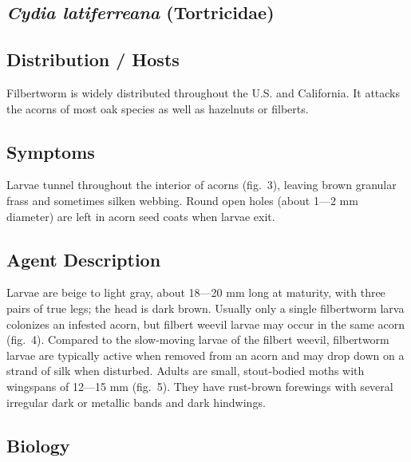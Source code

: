 \documentclass[
]{book}
\begin{document}
\subsection*{\texorpdfstring{\emph{Cydia latiferreana} (Tortricidae)}{Cydia latiferreana (Tortricidae)}}\label{cydia-latiferreana-tortricidae}

\subsection*{Distribution / Hosts}\label{distribution-hosts-1}

Filbertworm is widely distributed throughout the U.S. and California. It attacks the acorns of most oak species as well as hazelnuts or filberts.

\subsection*{Symptoms}\label{symptoms-1}

Larvae tunnel throughout the interior of acorns (fig.~3), leaving brown granular frass and sometimes silken webbing. Round open holes (about 1---2 mm diameter) are left in acorn seed coats when larvae exit.

\subsection*{Agent Description}\label{agent-description-1}

Larvae are beige to light gray, about 18---20 mm long at maturity, with three pairs of true legs; the head is dark brown. Usually only a single filbertworm larva colonizes an infested acorn, but filbert weevil larvae may occur in the same acorn (fig.~4). Compared to the slow-moving larvae of the filbert weevil, filbertworm larvae are typically active when removed from an acorn and may drop down on a strand of silk when disturbed. Adults are small, stout-bodied moths with wingspans of 12---15 mm (fig.~5). They have rust-brown forewings with several irregular dark or metallic bands and dark hindwings.

\subsection*{Biology}\label{biology-1}
\end{document}
